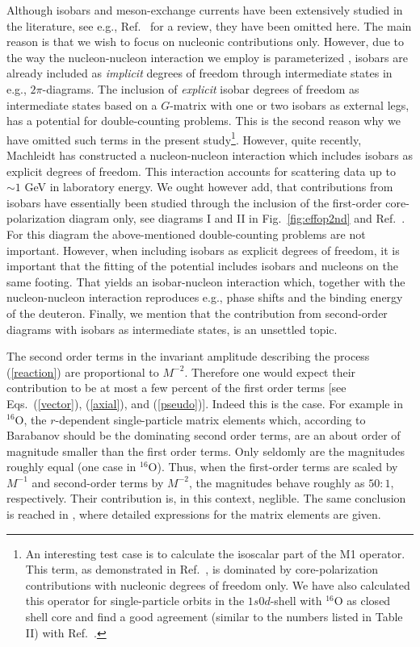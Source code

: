 Although isobars and meson-exchange currents have been extensively studied
in the literature, see e.g., Ref.~\cite{cas90} for a review, 
they have been omitted here. The main reason is that we wish to focus
on nucleonic contributions only. However, due to the way the nucleon-nucleon
interaction we employ is parameterized \cite{mac96}, 
isobars are already included as {\em implicit} degrees of freedom through 
intermediate states in e.g., $2\pi$-diagrams. The inclusion of 
{\em explicit} isobar degrees
of freedom as intermediate states based on 
a $G$-matrix with one or two isobars as external legs,
has a potential for double-counting problems. This is the second reason
why we have omitted such terms in the present study\footnote{An interesting test 
case is to calculate the isoscalar part of the M1 operator.
This term, as demonstrated in Ref.~\cite{tow87}, is dominated 
by core-polarization contributions with nucleonic degrees of freedom only.
We have also calculated this operator for single-particle orbits in the 
$1s0d$-shell with $^{16}$O as closed shell core and find a good agreement
(similar to the numbers listed in Table II) with Ref.~\cite{tow87}.}. 
However, quite recently,
Machleidt has constructed 
a nucleon-nucleon interaction which includes
isobars as explicit degrees of freedom. This interaction \cite{mach2000} 
accounts for scattering data up to $\sim 1$ GeV in laboratory energy.  
We ought however add, that contributions from isobars have essentially been
studied through the inclusion of the first-order 
core-polarization diagram only, see diagrams I and II in 
Fig.~\ref{fig:effop2nd} and Ref.~\cite{tow87}. For this diagram
the above-mentioned double-counting problems are not important. However, 
when including isobars as explicit degrees of freedom, it is important
that the fitting of the potential includes isobars and nucleons on the same
footing. That yields an isobar-nucleon interaction which, together
with the nucleon-nucleon interaction  reproduces
e.g., phase shifts
and the binding energy of the deuteron. 
Finally, we mention that the contribution from second-order
diagrams with isobars as intermediate states, is an unsettled topic. 


The second order terms in the invariant amplitude describing the process
(\ref{reaction}) are proportional to $M^{-2}$. Therefore one would expect
their contribution to be at most a few percent of the first order terms
[see Eqs.\ (\ref{vector}), (\ref{axial}), and (\ref{pseudo})]. Indeed this
is the case. For example in $^{16}$O, the $r$-dependent single-particle 
matrix elements which,
according to Barabanov \cite{bar98} should be the dominating second order
terms, 
are an about order of magnitude smaller than the first order terms. Only 
seldomly are  the magnitudes roughly equal (one case in $^{16}$O). Thus,
when the first-order terms are scaled by $M^{-1}$ and second-order terms by
$M^{-2}$, the magnitudes behave roughly as $50:1$, respectively.
Their contribution is, in this context,
neglible. The same conclusion is reached in \cite{bar98}, where detailed
expressions for the matrix elements are given. 


